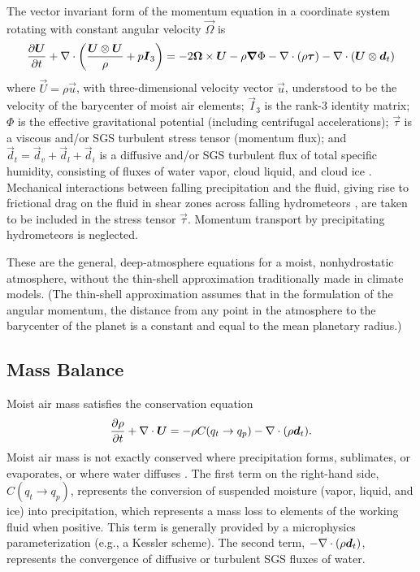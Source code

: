 \documentclass{article}
\begin{document}
The vector invariant form of the momentum equation in a coordinate system rotating with constant angular velocity $\vec{\Omega}$ is 
\begin{equation}
\frac{\partial \boldsymbol{{U}}}{\partial t} + \nabla \cdot \left( \frac{\boldsymbol{{U}} \otimes \boldsymbol{{U}} }{\rho} + p \boldsymbol{{I}}_3\right) = - 2\boldsymbol{{\Omega}} \times \boldsymbol{{U}}  - \rho \boldsymbol{{\nabla}}\Phi - \nabla \cdot (\rho\boldsymbol{{\tau}}) - \nabla \cdot\left( \boldsymbol{{U}} \otimes \boldsymbol{{d}}_t \right)
\label{eq:governing_equations/momentum}
\end{equation}
where $\vec{U}=\rho \vec{u}$, with three-dimensional velocity vector $\vec{u}$, understood to be the velocity of the barycenter of moist air elements; $\vec{I}_3$ is the rank-3 identity matrix; $\Phi$ is the effective gravitational potential (including centrifugal accelerations); $\vec{\tau}$ is a viscous and/or SGS turbulent stress tensor (momentum flux); and $\vec{d}_t =\vec{d}_v + \vec{d}_l + \vec{d}_i$ is a diffusive and/or SGS turbulent flux of total specific humidity, consisting of fluxes of water vapor, cloud liquid, and cloud ice \citep{Romps08a}. Mechanical interactions between falling precipitation and the fluid, giving rise to frictional drag on the fluid in shear zones across falling hydrometeors \citep{Pauluis00}, are taken to be included in the stress tensor $\vec{\tau}$. Momentum transport by precipitating hydrometeors is neglected.

These are the general, deep-atmosphere equations for a moist, nonhydrostatic atmosphere, without the thin-shell approximation traditionally made in climate models. (The thin-shell approximation assumes that in the formulation of the angular momentum, the distance from any point in the atmosphere to the barycenter of the planet is a constant and equal to the mean planetary radius.)

\subsection{Mass Balance}

Moist air mass satisfies the conservation equation
\begin{equation}
\frac{\partial \rho}{\partial t} + \nabla \cdot \boldsymbol{{U}} = - \rho C(q_t \rightarrow q_p) -\nabla \cdot (\rho \boldsymbol{{d}}_t).
\label{eq:governing_equations/mass}
\end{equation}
Moist air mass is not exactly conserved where precipitation forms, sublimates, or evaporates, or where water diffuses \citep{Bott08a}. The first term on the right-hand side, $C(q_t \rightarrow q_p)$, represents the conversion of suspended moisture (vapor, liquid, and ice) into precipitation, which represents a mass loss to elements of the working fluid when positive. This term is generally provided by a microphysics parameterization (e.g., a Kessler scheme). The second term, $-\nabla \cdot (\rho \boldsymbol{{d}}_t)$, represents the convergence of diffusive or turbulent SGS fluxes of water. 
\end{document}
